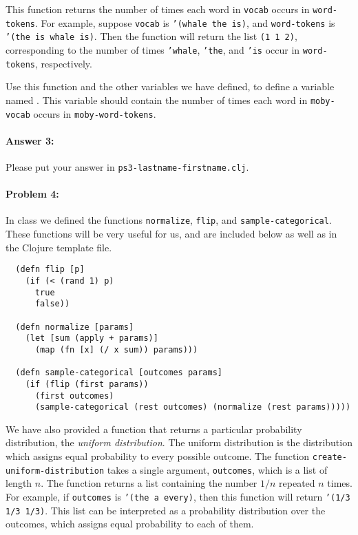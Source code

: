 \documentclass[10pt]{article}
\newcommand{\required}[1]{{\color{blue}{#1}}}
\newcommand{\PSnum}{3}
\begin{document}
This function returns the number of times each word in \texttt{vocab} occurs in
\texttt{word-tokens}. For example, suppose \texttt{vocab} is  \texttt{'(whale
the is)}, and \texttt{word-tokens} is  \texttt{'(the is whale is)}.  Then the
function will return the list \texttt{(1 1 2)}, corresponding to the number of
times \texttt{'whale}, \texttt{'the}, and \texttt{'is} occur in
\texttt{word-tokens}, respectively.

Use this function and the other variables we have
defined, to define a variable named \required{\texttt{moby-word-frequencies}}.
This variable should contain the number of times each word in
\texttt{moby-vocab} occurs in \texttt{moby-word-tokens}.

\paragraph{Answer 3:} Please put your answer in
\texttt{ps\PSnum-lastname-firstname.clj}.

\hrulefill %


\paragraph{Problem 4:}

In class we defined the functions \texttt{normalize}, \texttt{flip}, and
\texttt{sample-categorical}. These functions will be very useful for us, and are
included below as well as in the Clojure template file.

\begin{lstlisting}
  (defn flip [p]
    (if (< (rand 1) p)
      true
      false))

  (defn normalize [params]
    (let [sum (apply + params)]
      (map (fn [x] (/ x sum)) params)))

  (defn sample-categorical [outcomes params]
    (if (flip (first params))
      (first outcomes)
      (sample-categorical (rest outcomes) (normalize (rest params)))))
\end{lstlisting}

We have also provided a function that returns a particular probability
distribution, the \emph{uniform distribution}. The uniform distribution is the
distribution which assigns equal probability to every possible outcome. The
function \texttt{create-uniform-distribution} takes a single argument,
\texttt{outcomes}, which is a list of length $n$. The function returns a list
containing the number $1/n$ repeated $n$ times. For example, if
\texttt{outcomes} is \texttt{'(the a every)}, then this function will return
\texttt{'(1/3 1/3 1/3)}. This list can be interpreted as a probability
distribution over the outcomes, which assigns equal probability to each of them.
\end{document}
